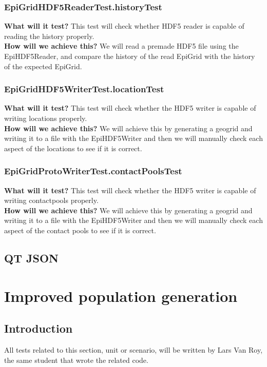 \documentclass{article}
\begin{document}
\subsubsection{EpiGridHDF5ReaderTest.historyTest} 
\textbf{What will it test?} 
This test will check whether HDF5 reader is capable of reading the history properly. \\
\newline
\textbf{How will we achieve this?} 
We will read a premade HDF5 file using the EpiHDF5Reader, and compare the history of the read EpiGrid with the history of the expected EpiGrid.
\subsubsection{EpiGridHDF5WriterTest.locationTest} 
\textbf{What will it test?} 
This test will check whether the HDF5 writer is capable of writing locations properly. \\
\newline
\textbf{How will we achieve this?} 
We will achieve this by generating a geogrid and writing it to a file with the EpiHDF5Writer and then we will manually check each aspect of the locations to see if it is correct.
\subsubsection{EpiGridProtoWriterTest.contactPoolsTest} 
\textbf{What will it test?} 
This test will check whether the HDF5 writer is capable of writing contactpools properly. \\
\newline
\textbf{How will we achieve this?} 
We will achieve this by generating a geogrid and writing it to a file with the EpiHDF5Writer and then we will manually check each aspect of the contact pools to see if it is correct.
\subsection{QT JSON}

\section{Improved population generation}
\subsection{Introduction}
All tests related to this section, unit or scenario, will be written by Lars Van Roy, the same student that wrote the related code.
\end{document}
